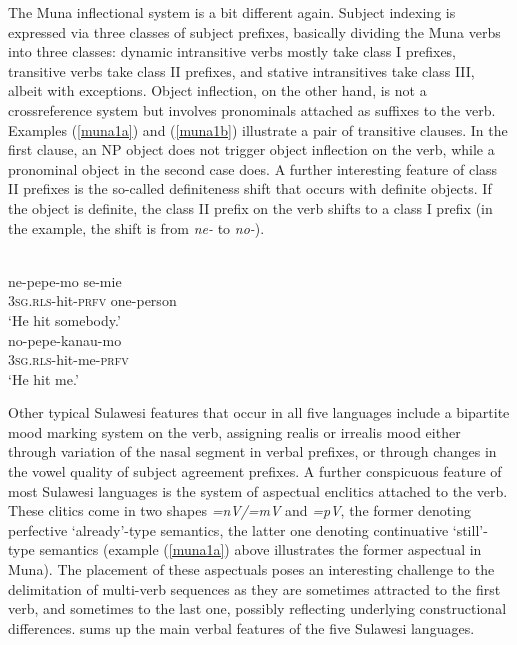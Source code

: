 The Muna inflectional system is a bit different again. Subject indexing is expressed via three classes of subject prefixes, basically dividing the Muna verbs into three classes: dynamic intransitive verbs mostly take class I prefixes, transitive verbs take class II prefixes, and stative intransitives take class III, albeit with exceptions. Object inflection, on the other hand, is not a crossreference system but involves pronominals attached as suffixes to the verb. Examples (\ref{muna1a}) and (\ref{muna1b}) illustrate a pair of transitive clauses. In the first clause, an NP object does not trigger object inflection on the verb, while a pronominal object in the second case does. A further interesting feature of class II prefixes is the so-called definiteness shift that occurs with definite objects. If the object is definite, the class II prefix on the verb shifts to a class I prefix (in the example, the shift is from \textit{ne-} to \textit{no-}).

\ea 
{}\\
\ea \label{muna1a}
\gll ne-pepe-mo se-mie \\
\textsc{3}\textsc{sg}.\textsc{rls}-hit-\textsc{prfv} one-person \\
\glft `He hit somebody.' \\ 
\ex \label{muna1b}
\gll no-pepe-kanau-mo \\ 
\textsc{3}\textsc{sg}.\textsc{rls}-hit-me-\textsc{prfv} \\
\glft `He hit me.' \\ 
\z
\z

Other typical Sulawesi features that occur in all five languages include a bipartite mood marking system on the verb, assigning realis or irrealis mood either through variation of the nasal segment in verbal prefixes, or through changes in the vowel quality of subject agreement prefixes. A further conspicuous feature of most Sulawesi languages is the system of aspectual enclitics attached to the verb. These clitics come in two shapes \textit{=nV/=mV} and \textit{=pV}, the former denoting perfective `already'-type semantics, the latter one denoting continuative `still'-type semantics (example (\ref{muna1a}) above illustrates the former aspectual in Muna). The placement of these aspectuals poses an interesting challenge to the delimitation of multi-verb sequences as they are sometimes attracted to the first verb, and sometimes to the last one, possibly reflecting underlying constructional differences.  sums up the main verbal features of the five Sulawesi languages.

